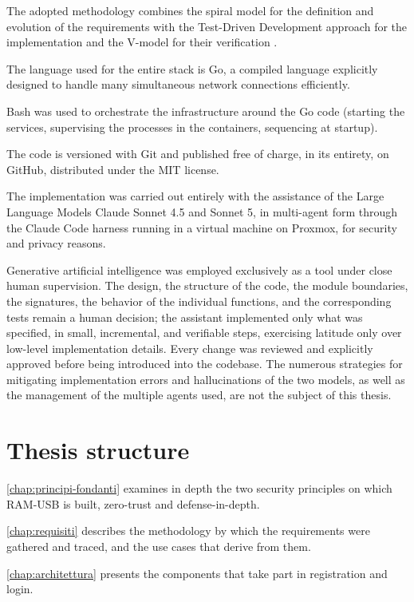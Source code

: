 The adopted methodology combines the spiral model for the definition and evolution of the
requirements \cite{Boehm88} with the Test-Driven Development approach for the implementation and the V-model for
their verification \cite{ramusb-contributing}.

The language used for the entire stack is Go, a compiled language explicitly designed to handle
many simultaneous network connections efficiently.

Bash was used to orchestrate the infrastructure around the Go code (starting the services, supervising the processes in the
containers, sequencing at startup).

The code is versioned with Git and published free of charge, in its entirety, on GitHub, distributed under
the MIT license.

The implementation was carried out entirely with the assistance of the Large Language Models Claude
Sonnet 4.5 and Sonnet 5, in multi-agent form through the Claude Code harness running in a virtual
machine on Proxmox, for security and privacy reasons.

Generative artificial intelligence was employed exclusively as a tool under close
human supervision.
The design, the structure of the code, the module boundaries, the signatures, the behavior of the individual
functions, and the corresponding tests remain a human decision; the assistant implemented only what was
specified, in small, incremental, and verifiable steps, exercising latitude only over low-level
implementation details.
Every change was reviewed and explicitly approved before being introduced into the codebase.
The numerous strategies for mitigating implementation errors and hallucinations of the two models, as well as the
management of the multiple agents used, are not the subject of this thesis.

\section{Thesis structure}

\autoref{chap:principi-fondanti} examines in depth the two security principles on which RAM-USB is built,
zero-trust and defense-in-depth.

\autoref{chap:requisiti} describes the methodology by which the requirements were gathered and traced,
and the use cases that derive from them.

\autoref{chap:architettura} presents the components that take part in registration and login.

